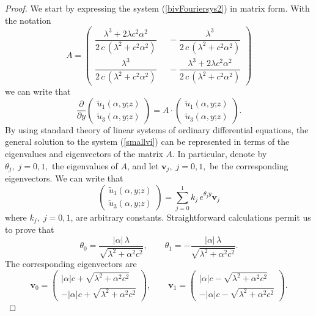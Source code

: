 \documentclass{article}
\begin{document}
\begin{proof}
We start by expressing the system (\ref{bivFouriersys2}) in matrix form. With the notation
$$A=\begin{pmatrix}
\dfrac{\lambda^3+2\lambda c^2\alpha^2}{2\,c\,(\lambda^2+c^2\alpha^2)}\; & \; -\dfrac{\lambda^3}{2\,c\,(\lambda^2+c^2\alpha^2)}\\
\dfrac{\lambda^3}{2\,c\,(\lambda^2+c^2\alpha^2)}\; & \; -\dfrac{\lambda^3+2\lambda c^2\alpha^2}{2\,c\,(\lambda^2+c^2\alpha^2)}
\end{pmatrix}$$
we can write that
\begin{equation}\label{smallvi}\frac{\partial}{\partial y}\begin{pmatrix}\widetilde{u}_1(\alpha,y\mathord{;}z)\\[0.5em] \widetilde{u}_3(\alpha,y\mathord{;}z)\end{pmatrix}=A\cdot\begin{pmatrix}\widetilde{u}_1(\alpha,y\mathord{;}z)\\[0.5em] \widetilde{u}_3(\alpha,y\mathord{;}z)\end{pmatrix}.\end{equation}
By using standard theory of linear systems of ordinary differential equations, the general solution to the system (\ref{smallvi}) can be represented in terms of the eigenvalues and eigenvectors of the matrix $A$. In particular, denote by $\theta_j,\;j=0,1,$ the eigenvalues of $A$, and let $\mathbf{v}_j,\;j=0,1,$ be the corresponding eigenvectors. We can write that 
$$\begin{pmatrix}\widetilde{u}_1(\alpha,y\mathord{;}z)\\[0.5em] \widetilde{u}_3(\alpha,y\mathord{;}z)\end{pmatrix}=\sum_{j=0}^1k_j\,e^{\theta_j y}\mathbf{v}_j$$ where $k_j,\;j=0,1$, are arbitrary constants. Straightforward calculations permit us to prove that
$$\theta_0=\frac{\lvert\alpha\lvert\,\lambda}{\sqrt{\lambda^2+\alpha^2c^2}},\qquad \theta_1=-\frac{\lvert\alpha\lvert\,\lambda}{\sqrt{\lambda^2+\alpha^2c^2}}.$$ The corresponding eigenvectors are
$$\mathbf{v}_0=\begin{pmatrix}\lvert\alpha\lvert c+\sqrt{\lambda^2+\alpha^2c^2}\\[0.75em]-\lvert\alpha\lvert c+\sqrt{\lambda^2+\alpha^2c^2}\end{pmatrix},\qquad \mathbf{v}_1=\begin{pmatrix}\lvert\alpha\lvert c-\sqrt{\lambda^2+\alpha^2c^2}\\[0.75em]-\lvert\alpha\lvert c-\sqrt{\lambda^2+\alpha^2c^2}\end{pmatrix}.$$

\end{proof}
\end{document}
